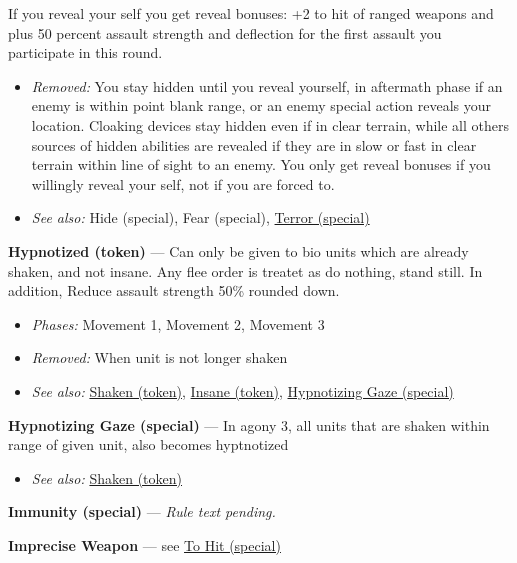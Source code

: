 \documentclass[a4paper,12pt]{article}
\begin{document}
If you reveal your self you get reveal bonuses: +2 to hit of ranged weapons and plus 50 percent assault strength and deflection for the first assault you participate in this round.
\begin{itemize}
\item \textit{Removed:} You stay hidden until you reveal yourself, in aftermath phase if an enemy is within point blank range, or an enemy special action reveals your location. Cloaking devices stay hidden even if in clear terrain, while all others sources of hidden abilities are revealed if they are in slow or fast in clear terrain within line of sight to an enemy. You only get reveal bonuses if you willingly reveal your self, not if you are forced to.
\item \textit{See also:} Hide (special), Fear (special), \hyperref[rule-special-terror]{Terror (special)}
\end{itemize}


\label{rule-token-hypnotized}%
\noindent\textbf{Hypnotized (token)} --- Can only be given to bio units which are already shaken, and not insane. Any flee order is treatet as do nothing, stand still. In addition, Reduce assault strength 50\% rounded down.
\begin{itemize}
\item \textit{Phases:} Movement 1, Movement 2, Movement 3
\item \textit{Removed:} When unit is not longer shaken
\item \textit{See also:} \hyperref[rule-token-shaken]{Shaken (token)}, \hyperref[rule-token-insane]{Insane (token)}, \hyperref[rule-special-hypnotizing-gaze]{Hypnotizing Gaze (special)}
\end{itemize}


\label{rule-special-hypnotizing-gaze}%
\noindent\textbf{Hypnotizing Gaze (special)} --- In agony 3, all units that are shaken within range of given unit, also becomes hyptnotized
\begin{itemize}
\item \textit{See also:} \hyperref[rule-token-shaken]{Shaken (token)}
\end{itemize}


\label{rule-special-immunity}%
\noindent\textbf{Immunity (special)} --- \textit{Rule text pending.}

\label{rule-alias-imprecise-weapon}%
\noindent\textbf{Imprecise Weapon} --- see \hyperref[rule-special-to-hit]{To Hit (special)}
\end{document}
